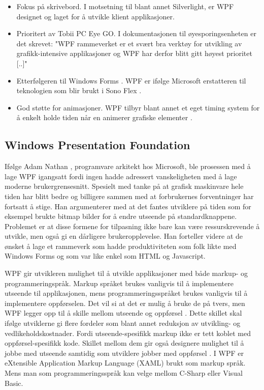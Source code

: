 \begin{itemize}
\item Fokus på skrivebord. I motsetning til blant annet Silverlight, er WPF designet og laget for å utvikle klient applikasjoner\cite{Windo777:online}.
\item Prioritert av Tobii PC Eye GO. I dokumentasjonen til øyesporingsenheten er det skrevet: "WPF  rammeverket er et svært bra verktøy for utvikling av grafikk-intensive applikasjoner og WPF har derfor blitt gitt høyest prioritet [..]"
\item Etterfølgeren til Windows Forms . WPF er ifølge Microsoft erstatteren til teknologien som blir brukt i Sono Flex \cite{User1111:online}. 
\item God støtte for animasjoner. WPF tilbyr blant annet et eget timing system for å enkelt holde tiden når en animerer grafiske elementer \cite{Anima7:online}.
\end{itemize}



 
\subsection{Windows Presentation Foundation} 
 
Ifølge Adam Nathan \cite[p.~9]{WPFbook}, programvare arkitekt hos Microsoft, ble prosessen med å lage WPF igangsatt fordi ingen hadde adressert vanskeligheten med å lage moderne brukergrensesnitt. Spesielt med tanke på at grafisk maskinvare hele tiden har blitt bedre og billigere sammen med at forbrukernes forventninger har fortsatt å stige. 
Han argumenterer med at det fantes utviklere på tiden som for eksempel brukte bitmap bilder for å endre utseende på standardknappene. Problemet er at disse formene for tilpasning ikke bare kan være ressurskrevende å utvikle, men også gi en dårligere brukeropplevelse. Han forteller videre at de ønsket å lage et rammeverk som hadde produktiviteten som folk likte med Windows Forms og som var like enkel som HTML og Javascript.

WPF gir utvikleren mulighet til å utvikle applikasjoner med både markup- og programmeringspråk. Markup språket brukes vanligvis til å implementere utseende til applikasjonen, mens programmeringsspråket brukes vanligvis til å implementere oppførselen. Det vil si at det er mulig å bruke de på tvers, men WPF legger opp til å skille mellom utseende og oppførsel \cite{Intro8:online}. Dette skillet skal ifølge utviklerne gi flere fordeler som blant annet reduksjon av utvikling- og vedlikeholdskostnader. Fordi utseende-spesifikk markup ikke er tett koblet med oppførsel-spesifikk kode. Skillet mellom dem gir også designere mulighet til å jobbe med utseende samtidig som utviklere jobber med oppførsel \cite{Intro8:online}. I WPF er eXtensible Application Markup Language (XAML) brukt som markup språk. Mens man som programmeringsspråk kan velge mellom C-Sharp eller Visual Basic.

